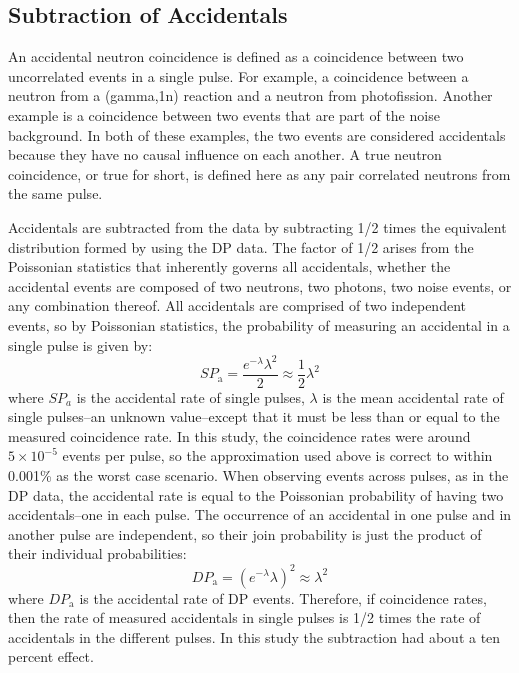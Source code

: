 \subsection{Subtraction of Accidentals}
\label{Subtraction of Accidentals}
An accidental neutron coincidence is defined as a coincidence between two uncorrelated events in a single pulse. For example, a coincidence between a neutron from a (gamma,1n) reaction and a neutron from photofission. Another example is a coincidence between two events that are part of the noise background. In both of these examples, the two events are considered accidentals because they have no causal influence on each another. A true neutron coincidence, or true for short, is defined here as any pair correlated neutrons from the same pulse. 

Accidentals are subtracted from the data by subtracting 1/2 times the equivalent distribution formed by using the DP data. The factor of 1/2 arises from the Poissonian statistics that inherently governs all accidentals, whether the accidental events are composed of two neutrons, two photons, two noise events, or any combination thereof. All accidentals are comprised of two independent events, so by Poissonian statistics, the probability of measuring an accidental in a single pulse is given by:
\begin{displaymath}
SP_{\text{a}} = \frac{e^{-\lambda}\lambda^2}{2} \approx \frac{1}{2}\lambda^{2}
\end{displaymath}
where $SP_{a}$ is the accidental rate of single pulses, $\lambda$ is the mean accidental rate of single pulses–an unknown value–except that it must be less than or equal to the measured coincidence rate. In this study, the coincidence rates were around $5\times10^{-5}$ events per pulse, so the approximation used above is correct to within 0.001\% as the worst case scenario. When observing events across pulses, as in the DP data, the accidental rate is equal to the Poissonian probability of having two accidentals--one in each pulse. The occurrence of an accidental in one pulse and in another pulse are independent, so their join probability is just the product of their individual probabilities:
\begin{displaymath}
DP_{\text{a}} = (e^{-\lambda}\lambda)^{2}\approx \lambda^{2} 
\end{displaymath}
where $DP_{\text{a}}$ is the accidental rate of DP events. Therefore, if coincidence rates, then the rate of measured accidentals in single pulses is 1/2 times the rate of accidentals in the different pulses. In this study the subtraction had about a ten percent effect.  
